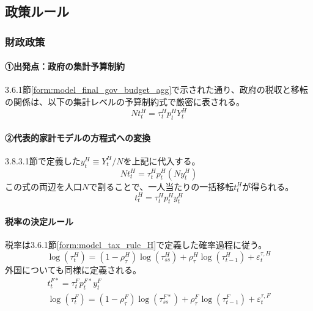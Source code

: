 \subsection{政策ルール}
\label{sec:model_final_equations_policy}
\subsubsection{財政政策}
\label{sec:model_final_equations_policy_fiscal}
\paragraph{①出発点：政府の集計予算制約}\label{sec:model_final_equations_policy_fiscal_origin}
3.6.1節\eqref{form:model_final_gov_budget_agg}で示された通り、政府の税収と移転の関係は、以下の集計レベルの予算制約式で厳密に表される。
\begin{equation}
Nt_t^H=\tau_t^Hp_t^HY_t^H
\label{form:model_final_equations_gov_agg_restated}
\end{equation}

\paragraph{②代表的家計モデルの方程式への変換}\label{sec:model_final_equations_policy_fiscal_ra_eq}
3.8.3.1節で定義した\(y_t^H\equiv Y_t^H/N\)を上記に代入する。
\begin{equation}
Nt_t^H=\tau_t^Hp_t^H(Ny_t^H)
\label{form:model_final_equations_gov_transfer_derivation}
\end{equation}
この式の両辺を人口\(N\)で割ることで、一人当たりの一括移転\(t_t^H\)が得られる。
\begin{equation}
t_t^H=\tau_t^Hp_t^Hy_t^H
\label{form:model_final_equations_gov_transfer_h}
\end{equation}

\paragraph{税率の決定ルール}\label{sec:model_final_equations_policy_fiscal_tax_rule}
税率は3.6.1節\eqref{form:model_tax_rule_H}で定義した確率過程に従う。
\begin{equation}
\log(\tau_t^H)=(1-\rho_\tau^H)\log(\tau_{ss}^H)+\rho_\tau^H\log(\tau_{t-1}^H)+\varepsilon_t^{\tau,H}
\label{form:model_final_equations_gov_tax_rule_h_restated}
\end{equation}
外国についても同様に定義される。
\begin{align}
t_t^{F*}=\tau_t^Fp_t^{F*}y_t^F \label{form:model_final_equations_gov_transfer_f} \\
\log(\tau_t^F)=(1-\rho_\tau^F)\log(\tau_{ss}^{F*})+\rho_\tau^F\log(\tau_{t-1}^F)+\varepsilon_t^{\tau,F} \label{form:model_final_equations_gov_tax_rule_f_restated}
\end{align}

